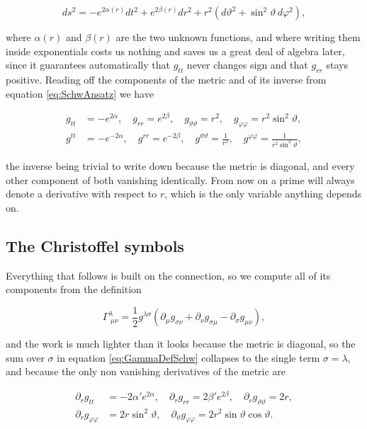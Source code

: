         \begin{equation}\label{eq:SchwAnsatz}
            ds^2 = -e^{2\alpha(r)}dt^2 + e^{2\beta(r)}dr^2 + r^2\left(d\vartheta^2 + \sin^2\vartheta\, d\varphi^2\right),
        \end{equation}

        where $\alpha(r)$ and $\beta(r)$ are the two unknown functions, and where writing them inside exponentials costs us nothing and saves us a great deal of algebra later, since it guarantees automatically that $g_{tt}$ never changes sign and that $g_{rr}$ stays positive. Reading off the components of the metric and of its inverse from equation \ref{eq:SchwAnsatz} we have

        \begin{align}
            g_{tt} &= -e^{2\alpha},\quad g_{rr} = e^{2\beta},\quad g_{\vartheta\vartheta}=r^2,\quad g_{\varphi\varphi}=r^2\sin^2\vartheta,\\
            g^{tt} &= -e^{-2\alpha},\quad g^{rr} = e^{-2\beta},\quad g^{\vartheta\vartheta}=\frac{1}{r^2},\quad g^{\varphi\varphi}=\frac{1}{r^2\sin^2\vartheta},
        \end{align}

        the inverse being trivial to write down because the metric is diagonal, and every other component of both vanishing identically. From now on a prime will always denote a derivative with respect to $r$, which is the only variable anything depends on.

    \subsection{The Christoffel symbols}

        Everything that follows is built on the connection, so we compute all of its components from the definition

        \begin{equation}\label{eq:GammaDefSchw}
            \Gamma^{\lambda}_{\;\mu\nu} = \frac{1}{2}g^{\lambda\sigma}\left(\partial_{\mu}g_{\sigma\nu} + \partial_{\nu}g_{\sigma\mu} - \partial_{\sigma}g_{\mu\nu}\right),
        \end{equation}

        and the work is much lighter than it looks because the metric is diagonal, so the sum over $\sigma$ in equation \ref{eq:GammaDefSchw} collapses to the single term $\sigma=\lambda$, and because the only non vanishing derivatives of the metric are

        \begin{align}
            \partial_rg_{tt} &= -2\alpha'e^{2\alpha},\quad \partial_rg_{rr} = 2\beta'e^{2\beta},\quad \partial_rg_{\vartheta\vartheta}=2r,\\
            \partial_rg_{\varphi\varphi} &= 2r\sin^2\vartheta,\quad \partial_{\vartheta}g_{\varphi\varphi}=2r^2\sin\vartheta\cos\vartheta.
        \end{align}

